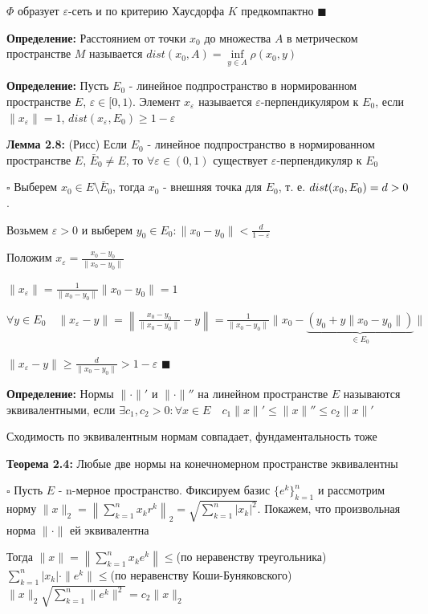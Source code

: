 \documentclass[a4paper]{report}
\newcommand*{\hm}[1]{#1\nobreak\discretionary{}%
            {\hbox{$\mathsurround=0pt #1$}}{}}
\begin{document}
$\Phi$ образует $\varepsilon$-сеть и по критерию Хаусдорфа $K$ предкомпактно $\blacksquare$
\bigskip

\noindent\textbf{Определение:} Расстоянием от точки $x_0$ до множества $A$ в метрическом пространстве $M$ называется
$dist(x_0,A)=\inf\limits_{y\in A}\rho(x_0,y)$
\bigskip

\noindent\textbf{Определение:} Пусть $E_0$ - линейное подпространство в нормированном пространстве $E$, $\varepsilon\in[0,1)$.
Элемент $x_\varepsilon$ называется $\varepsilon$-перпендикуляром к $E_0$, если $\|x_\varepsilon\|=1$, $dist(x_\varepsilon,
E_0)\ge1-\varepsilon$
\bigskip

\noindent\textbf{Лемма 2.8:} (Рисс) Если $E_0$ - линейное подпространство в нормированном пространстве $E$, $\bar E_0\ne E$,
то $\forall\varepsilon\in(0,1)$ существует $\varepsilon$-перпендикуляр к $E_0$

\noindent $\square$ Выберем $x_0\in E\setminus\bar E_0$, тогда $x_0$ - внешняя точка для $E_0$, т. е. $dist(x_0,E_0)\hm=d>0$.

Возьмем $\varepsilon>0$ и выберем $y_0\in E_0\colon\|x_0-y_0\|<\frac{d}{1-\varepsilon}$

Положим $x_\varepsilon=\frac{x_0-y_0}{\|x_0-y_0\|}$

$\|x_\varepsilon\|=\frac{1}{\|x_0-y_0\|}\|x_0-y_0\|=1$

$\forall y\in E_0\quad\|x_\varepsilon-y\|=\left\|\frac{x_0-y_0}{\|x_0-y_0\|}-y\right\|=\frac{1}{\|x_0-y_0\|}\|x_0-\underbrace{
(y_0+y\|x_0-y_0\|)}_{\in E_0}\|$

$\|x_\varepsilon-y\|\ge\frac{d}{\|x_0-y_0\|}>1-\varepsilon$ $\blacksquare$
\bigskip

\noindent\textbf{Определение:} Нормы $\|\cdot\|'$ и $\|\cdot\|''$ на линейном пространстве $E$ называются эквивалентными,
если $\exists c_1,c_2>0\colon\forall x\in E\quad c_1\|x\|'\le\|x\|''\le c_2\|x\|'$
\bigskip

Сходимость по эквивалентным нормам совпадает, фундаментальность тоже
\bigskip

\noindent\textbf{Теорема 2.4:} Любые две нормы на конечномерном пространстве эквивалентны

\noindent $\square$ Пусть $E$ - n-мерное пространство. Фиксируем базис $\{e^k\}_{k=1}^n$ и рассмотрим норму $\|x\|_2=
\left\|\sum\limits_{k=1}^n x_k r^k\right\|_2=\sqrt{\sum\limits_{k=1}^n|x_k|^2}$. Покажем, что произвольная норма $\|\cdot\|$ ей
эквивалентна

Тогда $\|x\|=\left\|\sum\limits_{k=1}^n x_k e^k\right\|\le$(по неравенству треугольника)$\sum\limits_{k=1}^n|x_k|\cdot
\|e^k\|\le$(по неравенству Коши-Буняковского)$\|x\|_2\sqrt{\sum\limits_{k=1}^n\|e^k\|^2}=c_2\|x\|_2$
\end{document}
